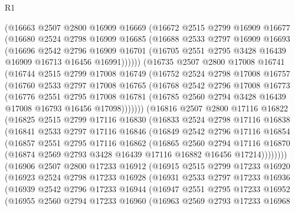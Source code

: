 \begin{lexlean}{R1}
\begin{coremodule}
    (@16663
      @2507
      @2800
      @16909
      @16669
      (@16672
        @2515
        @2799
        @16909
        @16677
        (@16680
          @2524
          @2798
          @16909
          @16685
          (@16688
            @2533
            @2797
            @16909
            @16693
            (@16696
              @2542
              @2796
              @16909
              @16701
              (@16705 @2551 @2795 @3428 @16439 @16909 @16713 @16456 @16991))))))
    (@16735
      @2507
      @2800
      @17008
      @16741
      (@16744
        @2515
        @2799
        @17008
        @16749
        (@16752
          @2524
          @2798
          @17008
          @16757
          (@16760
            @2533
            @2797
            @17008
            @16765
            (@16768
              @2542
              @2796
              @17008
              @16773
              (@16776
                @2551
                @2795
                @17008
                @16781
                (@16785 @2560 @2794 @3428 @16439 @17008 @16793 @16456 @17098)))))))
    (@16816
      @2507
      @2800
      @17116
      @16822
      (@16825
        @2515
        @2799
        @17116
        @16830
        (@16833
          @2524
          @2798
          @17116
          @16838
          (@16841
            @2533
            @2797
            @17116
            @16846
            (@16849
              @2542
              @2796
              @17116
              @16854
              (@16857
                @2551
                @2795
                @17116
                @16862
                (@16865
                  @2560
                  @2794
                  @17116
                  @16870
                  (@16874 @2569 @2793 @3428 @16439 @17116 @16882 @16456 @17214))))))))
    (@16906
      @2507
      @2800
      @17233
      @16912
      (@16915
        @2515
        @2799
        @17233
        @16920
        (@16923
          @2524
          @2798
          @17233
          @16928
          (@16931
            @2533
            @2797
            @17233
            @16936
            (@16939
              @2542
              @2796
              @17233
              @16944
              (@16947
                @2551
                @2795
                @17233
                @16952
                (@16955
                  @2560
                  @2794
                  @17233
                  @16960
                  (@16963
                    @2569
                    @2793
                    @17233
                    @16968

\end{coremodule}
\end{lexlean}
